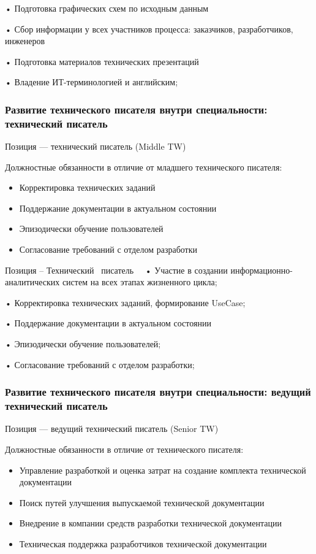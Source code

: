 \documentclass{../industrial-development}
\begin{document}
•	Подготовка графических схем по исходным данным

•	Сбор информации у всех участников процесса: заказчиков, разработчиков, инженеров

•	Подготовка материалов технических презентаций

•	Владение ИТ-терминологией и английским;

\begin{frame} \frametitle{Развитие технического писателя внутри специальности: технический писатель }
  \begin{block}{}
  \alert{Позиция --- технический писатель (Middle TW) }

Должностные обязанности в отличие от младшего технического писателя: 
  \end{block}
  \begin{itemize}
  \item Корректировка технических заданий
  \item  Поддержание документации в актуальном состоянии
  \item Эпизодически обучение пользователей
 \item 	Согласование требований с отделом разработки
  \end{itemize}
\end{frame}


\lecturenotes

Позиция –  Технический~\cite{hh} писатель~\cite{itcf}~\cite{rab}
•	Участие в создании информационно-аналитических систем на всех этапах жизненного цикла;

•	Корректировка технических заданий, формирование UseCase;

•	Поддержание документации в актуальном состоянии

•	Эпизодически обучение пользователей;

•	Согласование требований с отделом разработки;

\begin{frame} \frametitle{Развитие технического писателя внутри специальности: ведущий технический писатель }
  \begin{block}{}
  \alert{Позиция --- ведущий технический писатель (Senior TW) }

Должностные обязанности в отличие от технического писателя: 
  \end{block}
  \begin{itemize}
  \item Управление разработкой и оценка затрат на создание комплекта технической документации
  \item Поиск путей улучшения выпускаемой технической документации
  \item Внедрение в компании средств разработки технической документации
 \item 	 Техническая поддержка разработчиков технической документации
  \end{itemize}
\end{frame}
\end{document}
